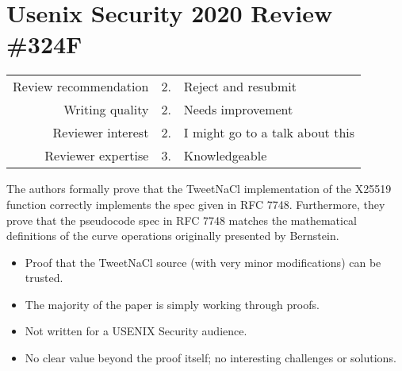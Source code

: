 \newpage
\section*{Usenix Security 2020 Review \#324F}

\begin{tabular}{rrp{}}
    \toprule
    Review recommendation & 2.& Reject and resubmit             \\
    Writing quality       & 2.& Needs improvement               \\
    Reviewer interest     & 2.& I might go to a talk about this \\
    Reviewer expertise    & 3.& Knowledgeable                   \\
    \bottomrule
\end{tabular}

\begin{center}
\end{center}

The authors formally prove that the TweetNaCl implementation of the X25519
function correctly implements the spec given in RFC 7748. Furthermore, they
prove that the pseudocode spec in RFC 7748 matches the mathematical definitions
of the curve operations originally presented by Bernstein.

\begin{center}
\end{center}
\begin{itemize}
    \item Proof that the TweetNaCl source (with very minor modifications) can be trusted.
\end{itemize}

\begin{center}
\end{center}

\begin{itemize}
    \item The majority of the paper is simply working through proofs.
    \item Not written for a USENIX Security audience.
    \item No clear value beyond the proof itself; no interesting challenges or solutions.
\end{itemize}

\begin{center}
\end{center}

